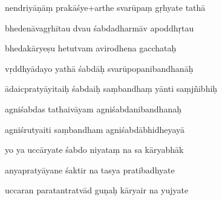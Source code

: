 \documentclass[article,12pt,a4paper]{memoir}%
\newcounter{parCount}
\begin{document}
	  
	  \pstart \leavevmode%
	nendriyāṇāṃ prakāśye+arthe svarūpaṃ gṛhyate tathā 
	{}
	\pend%
      

	  
	  \pstart {} bhedenāvagṛhītau dvau śabdadharmāv apoddhṛtau 
	{}
	\pend%
      

	  
	  \pstart \leavevmode%
	bhedakāryeṣu hetutvam avirodhena gacchataḥ 
	{}
	\pend%
      

	  
	  \pstart {} vṛddhyādayo yathā śabdāḥ svarūpopanibandhanāḥ 
	{}
	\pend%
      

	  
	  \pstart \leavevmode%
	ādaicpratyāyitaiḥ śabdaiḥ saṃbandhaṃ yānti saṃjñibhiḥ 
	{}
	\pend%
      

	  
	  \pstart {} agniśabdas tathaivāyam agniśabdanibandhanaḥ 
	{}
	\pend%
      

	  
	  \pstart \leavevmode%
	agniśrutyaiti saṃbandham agniśabdābhidheyayā 
	{}
	\pend%
      

	  
	  \pstart {} yo ya uccāryate śabdo niyataṃ na sa kāryabhāk 
	{}
	\pend%
      

	  
	  \pstart \leavevmode%
	anyapratyāyane śaktir na tasya pratibadhyate 
	{}
	\pend%
      

	  
	  \pstart {} uccaran paratantratvād guṇaḥ kāryair na yujyate 
	{}
	\pend%
      
\end{document}

